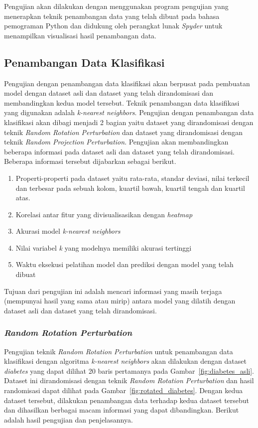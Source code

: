 Pengujian akan dilakukan dengan menggunakan program pengujian yang menerapkan teknik penambangan data yang telah dibuat pada bahasa pemograman Python dan didukung oleh perangkat lunak \textit{Spyder} untuk menampilkan visualisasi hasil penambangan data.

\subsection{Penambangan Data Klasifikasi}
\label{subsec:pengujian-klasifikasi}
Pengujian dengan penambangan data klasifikasi akan berpusat pada pembuatan model dengan dataset asli dan dataset yang telah dirandomisasi dan membandingkan kedua model tersebut. Teknik penambangan data klasifikasi yang digunakan adalah \textit{k-nearest neighbors}. Pengujian dengan penambangan data klasifikasi akan dibagi menjadi 2 bagian yaitu dataset yang dirandomisasi dengan teknik \textit{Random Rotation Perturbation} dan dataset yang dirandomisasi dengan teknik \textit{Random Projection Perturbation}. Pengujian akan membandingkan beberapa informasi pada dataset asli dan dataset yang telah dirandomisasi. Beberapa informasi tersebut dijabarkan sebagai berikut.
\begin{enumerate}
	\item Properti-properti pada dataset yaitu rata-rata, standar deviasi, nilai terkecil dan terbesar pada sebuah kolom, kuartil bawah, kuartil tengah dan kuartil atas.
	\item Korelasi antar fitur yang divisualisasikan dengan \textit{heatmap}
	\item Akurasi model \textit{k-nearest neighbors}
	\item Nilai variabel \textit{k} yang modelnya memiliki akurasi tertinggi
	\item Waktu eksekusi pelatihan model dan prediksi dengan model yang telah dibuat
\end{enumerate}
Tujuan dari pengujian ini adalah mencari informasi yang masih terjaga (mempunyai hasil yang sama atau mirip) antara model yang dilatih dengan dataset asli dan dataset yang telah dirandomisasi.

\subsubsection{\textit{Random Rotation Perturbation}}
\label{subsubsec:pengujian-klasifikasi-rrp}

Pengujian teknik \textit{Random Rotation Perturbation} untuk penambangan data klasifikasi dengan algoritma \textit{k-nearest neighbors} akan dilakukan dengan dataset \textit{diabetes} yang dapat dilihat 20 baris pertamanya pada Gambar~\ref{fig:diabetes_asli}. Dataset ini dirandomisasi dengan teknik \textit{Random Rotation Perturbation} dan hasil randomisasi dapat dilihat pada Gambar~\ref{fig:rotated_diabetes}. Dengan kedua dataset tersebut, dilakukan penambangan data terhadap kedua dataset tersebut dan dihasilkan berbagai macam informasi yang dapat dibandingkan. Berikut adalah hasil pengujian dan penjelasannya.

